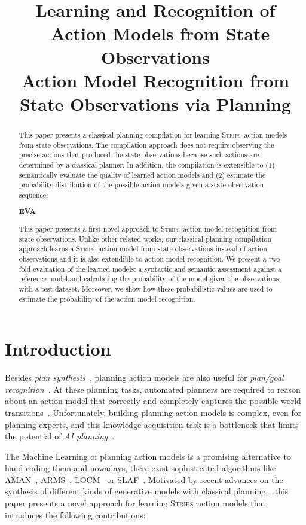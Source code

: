 \documentclass{article}
\title{Learning and Recognition of \strips\ Action Models from State Observations \\ Action Model Recognition from State Observations via Planning}
\author{
}
\newcommand{\strips}{\textsc{Strips}}     %
\begin{document}
\maketitle

\begin{abstract}
This paper presents a classical planning compilation for learning \strips\ action models from state observations. The compilation approach does not require observing the precise actions that produced the state observations because such actions are determined by a classical planner. In addition, the compilation is extensible to (1) semantically evaluate the quality of learned action models and (2) estimate the probability distribution of the possible action models given a state observation sequence.


\textbf{EVA}


This paper presents a first novel approach to \strips\ action model recognition from state observations. Unlike other related works, our classical planning compilation approach learns a \strips\ action model from state observations instead of action observations and it is also extendible to action model recognition. We present a two-fold evaluation of the learned models: a syntactic and semantic assessment against a reference model and calculating the probability of the model given the observations with a test dataset. Moreover, we show how these probabilistic values are used to estimate the probability of the action model recognition.




\end{abstract}

\section{Introduction}
Besides {\em plan synthesis}~\cite{ghallab2004automated}, planning action models are also useful for {\em plan/goal recognition}~\cite{ramirez2012plan}. At these planning tasks, automated planners are required to reason about an action model that correctly and completely captures the possible world transitions~\cite{geffner:book:2013}. Unfortunately, building planning action models is complex, even for planning experts, and this knowledge acquisition task is a bottleneck that limits the potential of {\em AI planning}~\cite{kambhampati:modellite:AAAI2007}.

The Machine Learning of planning action models is a promising alternative to hand-coding them and nowadays, there exist sophisticated algorithms like {\sc AMAN}~\cite{zhuo2013action}, {\sc ARMS}~\cite{yang2007learning}, {\sc LOCM}~\cite{cresswell2013acquiring} or {\sc SLAF}~\cite{amir:alearning:JAIR08}. Motivated by recent advances on the synthesis of different kinds of generative models with classical planning~\cite{bonet2009automatic,segovia2016hierarchical,segovia2017generating}, this paper presents a novel approach for learning \strips\ action models that introduces the following contributions:
\end{document}
